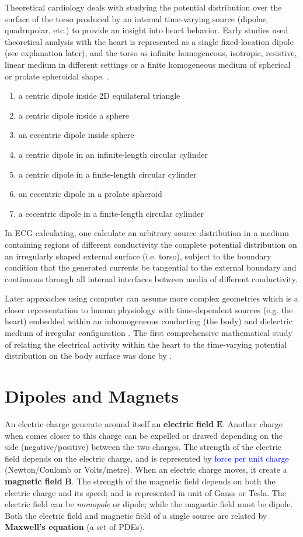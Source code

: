 Theoretical cardiology deals with studying the potential distribution over the
surface of the torso produced by an internal time-varying source (dipolar,
quadrupolar, etc.) to provide an insight into heart behavior.  Early studies
used theoretical analysis with the heart is represented as a single
fixed-location dipole (see explanation later), and the torso as
infinite homogeneous, isotropic, resistive, linear medium in different settings
or a finite homogeneous medium of spherical or prolate spheroidal shape.
\citep{okada1956}.
\begin{enumerate}
  \item a centric dipole inside 2D equilateral triangle
  \item a centric dipole inside a sphere
  \item an eccentric dipole inside sphere
  \item a centric dipole in an infinite-length circular cylinder
  \item a centric dipole in a finite-length circular cylinder
  \item an eccentric dipole in a prolate spheroid
  \item a eccentric dipole in a finite-length circular cylinder
\end{enumerate}

In ECG calculating, one calculate an arbitrary source distribution
in a medium containing regions of different conductivity the complete potential
distribution on an irregularly shaped external surface (i.e. torso), subject to
the boundary condition that the generated currents be tangential to the external
boundary and continuous through all internal interfaces between media of
different conductivity.

Later approaches using computer can assume more complex geometries which is a
closer representation to human physiology with time-dependent sources (e.g. the
heart) embedded within an inhomogeneous conducting (the body) and dielectric
medium of irregular configuration \citep{barnard1967a}. The first comprehensive
mathematical study of relating the electrical activity within the heart to the
time-varying potential distribution on the body surface was done by
\citep{gelernter1964}.

\section{Dipoles and Magnets}

An electric charge generate around itself an {\bf electric field} $\mathbf{E}$.
Another charge when comes closer to this charge can be expelled or drawed
depending on the side (negative/positive) between the two charges. The strength
of the electric field depends on the electric charge, and is represented by
\textcolor{blue}{force per unit charge} (Newton/Coulomb or Volts/metre).
When an electric charge moves, it create a {\bf magnetic field} $\mathbf{B}$.
The strength of the magnetic field depends on both the electric charge and its
speed; and is represented in unit of Gauss or Tesla. The electric field can be
{\it monopole} or dipole; while the magnetic field must be dipole.
Both the electric field and magnetic field of a single source are related by
{\bf Maxwell's equation} (a set of PDEs).



